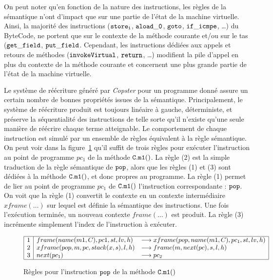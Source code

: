 On peut noter qu'en fonction de la nature des instructions, les règles
de la sémantique n'ont d'impact que sur une partie de l'état de la
machine virtuelle. Ainsi, la majorité des instructions ($\mathtt{store_i}$,
$\mathtt{aload\_0}$, $\mathtt{goto}$, $\mathtt{if\_icmpe}$, \dots) du ByteCode,
ne portent que sur le contexte de la méthode courante et/ou sur le tas
($\mathtt{get\_field}$, $\mathtt{put\_field}$. Cependant, les instructions
dédiées aux appels et retours de méthodes ($\mathtt{invokeVirtual}$, $\mathtt{return}$, \dots)
modifient la pile d'appel en plus du contexte de la méthode courante et
concernent une plus grande partie de l'état de la machine virtuelle.

Le système de réécriture généré par \emph{Copster} pour un programme
donné assure un certain nombre de bonnes propriétés issues de la
sémantique. Principalement, le système de réécriture produit est toujours
linéaire à gauche, déterministe, et préserve la séquentialité
des instructions de telle sorte qu'il n'existe qu'une seule manière de
réécrire chaque terme atteignable.  Le comportement de chaque
instruction est simulé par un ensemble de règles équivalent à la règle
sémantique. On peut voir dans la figure~\ref{fig:semantique-trs} qu'il suffit
de trois règles pour exécuter l'instruction au point de programme $pc_1$ de la méthode
$\mathtt{C.m1()}$. La règle (2) est la simple traduction de la règle sémantique de $\mathtt{pop}$,
alors que les règles (1) et (3) sont dédiées à la méthode $\mathtt{C.m1}()$, et donc propres au 
programme. La règle (1) permet de lier au point de programme $pc_1$ de $\mathtt{C.m1}()$ l'instruction
correspondante : $\mathtt{pop}$. On voit que la règle (1) convertit le contexte en un contexte intermédiaire $xframe(\dots)$
sur lequel est définie la sémantique des instructions. Une fois l'exécution terminée, un nouveau 
contexte $frame(\dots)$ est produit. La règle (3) incrémente simplement l'index de l'instruction à exécuter.

\begin{figure}[ht!]
  \centering
  \[
  {%
    \begin{array}{|c|ll|}
      \hline
      1 & frame(name(m1, C), pc1, st, lv, h) & \lrw xframe(pop, name(m1, C), pc_1, st, lv, h)\\
      2 & xframe(pop, m, pc, stack(x, s), l, h) & \lrw frame(m, next(pc), s, l, h) \\
      3 & next(pc_1) &\lrw pc_2 \\
      \hline
    \end{array}
  }
  \]
  \caption{\footnotesize Règles pour l'instruction $\mathtt{pop}$ de la méthode $\mathtt{C.m1()}$}
  \label{fig:semantique-trs}
\end{figure}


